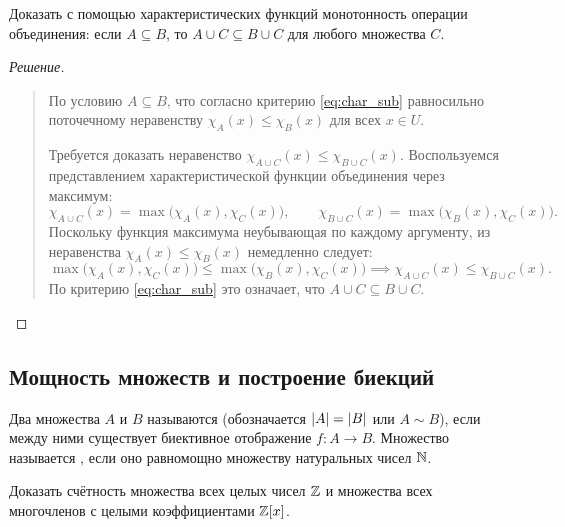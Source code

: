 \begin{problem}
    Доказать с помощью характеристических функций монотонность операции 
    объединения: если $A \subseteq B$, то $A \cup C \subseteq B \cup C$ для 
    любого множества $C$.
\end{problem}

\begin{proof}[Решение]~\\
    \begin{quote}
        По условию $A \subseteq B$, что согласно критерию \eqref{eq:char_sub} 
        равносильно поточечному неравенству $\chi_A(x) \le \chi_B(x)$ для 
        всех $x \in U$.

        Требуется доказать неравенство $\chi_{A \cup C}(x) \le 
        \chi_{B \cup C}(x)$. Воспользуемся представлением характеристической 
        функции объединения через максимум:
        \[
            \chi_{A \cup C}(x) = \max\bigl(\chi_A(x), \chi_C(x)\bigr), \qquad
            \chi_{B \cup C}(x) = \max\bigl(\chi_B(x), \chi_C(x)\bigr).
        \]
        Поскольку функция максимума неубывающая по каждому аргументу, из 
        неравенства $\chi_A(x) \le \chi_B(x)$ немедленно следует:
        \[
            \max\bigl(\chi_A(x), \chi_C(x)\bigr) \le 
            \max\bigl(\chi_B(x), \chi_C(x)\bigr) \implies 
            \chi_{A \cup C}(x) \le \chi_{B \cup C}(x).
        \]
        По критерию \eqref{eq:char_sub} это означает, что 
        $A \cup C \subseteq B \cup C$.
    \end{quote}
\end{proof}

\subsection{Мощность множеств и построение биекций}

\begin{definition}
    Два множества $A$ и $B$ называются  (обозначается 
    $\left| A \right| = \left| B \right|$ или $A \sim B$), если между ними существует 
    биективное отображение $f: A \to B$. Множество называется 
    , если оно равномощно множеству натуральных чисел $\mathbb{N}$.
\end{definition}

\begin{problem}
    Доказать счётность множества всех целых чисел $\mathbb{Z}$ и множества всех 
    многочленов с целыми коэффициентами $\mathbb{Z}[x]$.
\end{problem}


